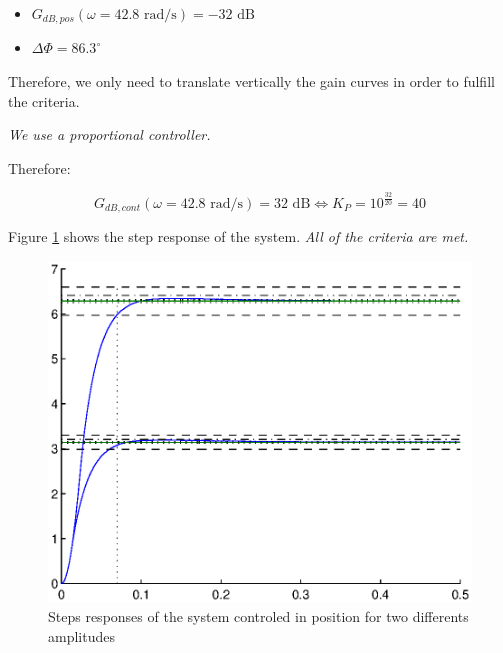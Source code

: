 \begin{itemize}
 \item $G_{dB,pos}(\omega = 42.8 \text{ rad/s}) = -32 \text{ dB}$
 \item $\Delta \Phi = 86.3^{\circ}$
\end{itemize}

Therefore, we only need to translate vertically the gain curves in order to fulfill the criteria.

\emph{We use a proportional controller.}

Therefore:

$$ G_{dB,cont}(\omega = 42.8 \text{ rad/s}) = 32 \text{ dB} \Leftrightarrow K_P = 10^{\frac{32}{20}} = 40$$

Figure \ref{StepPPos} shows the step response of the system. \emph{All of the criteria are met.}

\begin{center}
\begin{figure}[Ht]
 \includegraphics[width=\linewidth]{fig/StepPPos.eps}
 \caption{Steps responses of the system controled in position for two differents amplitudes}
 \label{StepPPos}
\end{figure}
\end{center}







